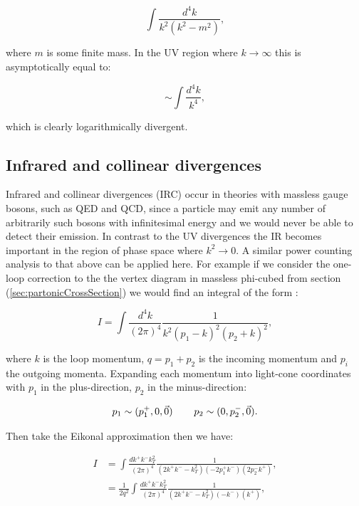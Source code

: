 		\begin{equation}
			\int \frac{d^4k}{k^2(k^2-m^2)},
		\end{equation}

		where $m$ is some finite mass. In the UV region where $k\rightarrow\infty$ this is asymptotically equal
		to:

		\begin{equation}
			\sim\int\frac{d^4k}{k^4},
		\end{equation}

		which is clearly logarithmically divergent.

	\subsection{Infrared and collinear divergences}

		Infrared and collinear divergences (IRC) occur in theories with massless gauge bosons, such as
		QED and QCD, since a particle may emit any number of arbitrarily such bosons with infinitesimal
		energy and we would never be able to detect their emission.  In contrast to the UV divergences
		the IR becomes important in the region of phase space where $k^2\rightarrow0$.  A similar power
		counting analysis to that above can be applied here.  For example if we consider the one-loop
		correction to the the vertex diagram in massless phi-cubed from section (\ref{sec:partonicCrossSection})
		we would find an integral of the form \cite{Sterman:1995fz}:

		\begin{equation}
			I = \int\frac{d^4k}{(2\pi)^4}\frac{1}{k^2(p_1-k)^2(p_2+k)^2},
		\end{equation}

		where $k$ is the loop momentum, $q=p_1+p_2$ is the incoming momentum and $p_i$ the outgoing
		momenta.  Expanding each momentum into light-cone coordinates with $p_1$ in the plus-direction,
		$p_2$ in the minus-direction:

		\begin{align}
			p_1 \sim (p_1^+, 0, \vec{0}) \hspace{0.75cm} p_2 \sim (0, p_2^-, \vec{0}).
		\end{align}

		Then take the Eikonal approximation then we have:

		\begin{align}
			I &= \int\frac{dk^+k^-k^2_T}{(2\pi)^4}\frac{1}{(2k^+k^- - k_T^2)(-2p_1^+k^-)(2p_2^-k^+)},\\
			  &= \frac{1}{2q^2}\int\frac{dk^+k^-k^2_T}{(2\pi)^4}\frac{1}{(2k^+k^- - k_T^2)(-k^-)(k^+)},
			  \label{eqn:IRCscaling}
		\end{align}


